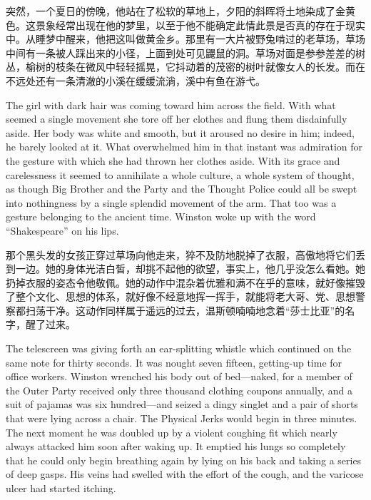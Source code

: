 \begin{paracol}{2}
\switchcolumn

突然，一个夏日的傍晚，他站在了松软的草地上，夕阳的斜晖将土地染成了金黄色。这景象经常出现在他的梦里，以至于他不能确定此情此景是否真的存在于现实中。从睡梦中醒来，他把这叫做黄金乡。那里有一大片被野兔啃过的老草场，草场中间有一条被人踩出来的小径，上面到处可见鼹鼠的洞。草场对面是参参差差的树丛，榆树的枝条在微风中轻轻摇晃，它抖动着的茂密的树叶就像女人的长发。而在不远处还有一条清澈的小溪在缓缓流淌，溪中有鱼在游弋。

\switchcolumn*

The girl with dark hair was coming toward him across the field. With
what seemed a single movement she tore off her clothes and flung them
disdainfully aside. Her body was white and smooth, but it aroused no
desire in him; indeed, he barely looked at it. What overwhelmed him in
that instant was admiration for the gesture with which she had thrown
her clothes aside. With its grace and carelessness it seemed to
annihilate a whole culture, a whole system of thought, as though Big
Brother and the Party and the Thought Police could all be swept into
nothingness by a single splendid movement of the arm. That too was a
gesture belonging to the ancient time. Winston woke up with the word
``Shakespeare'' on his lips.

\switchcolumn

那个黑头发的女孩正穿过草场向他走来，猝不及防地脱掉了衣服，高傲地将它们丢到一边。她的身体光洁白皙，却挑不起他的欲望，事实上，他几乎没怎么看她。她扔掉衣服的姿态令他敬佩。她的动作中混杂着优雅和满不在乎的意味，就好像摧毁了整个文化、思想的体系，就好像不经意地挥一挥手，就能将老大哥、党、思想警察都扫荡干净。这动作同样属于遥远的过去，温斯顿喃喃地念着``莎士比亚''的名字，醒了过来。

\switchcolumn*

The telescreen was giving forth an ear-splitting whistle which continued
on the same note for thirty seconds. It was nought seven fifteen,
getting-up time for office workers. Winston wrenched his body out of
bed---naked, for a member of the Outer Party received only three
thousand clothing coupons annually, and a suit of pajamas was six
hundred---and seized a dingy singlet and a pair of shorts that were
lying across a chair. The Physical Jerks would begin in three minutes.
The next moment he was doubled up by a violent coughing fit which nearly
always attacked him soon after waking up. It emptied his lungs so
completely that he could only begin breathing again by lying on his back
and taking a series of deep gasps. His veins had swelled with the effort
of the cough, and the varicose ulcer had started itching.


\end{paracol}

